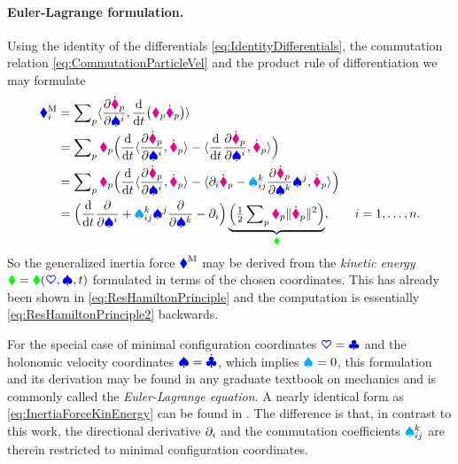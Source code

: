 \paragraph{Euler-Lagrange formulation.}
Using the identity of the differentials \eqref{eq:IdentityDifferentials}, the commutation relation \eqref{eq:CommutationParticleVel} and the product rule of differentiation we may formulate
\begin{align}
 \genForceInertiaCoeff{\LidxI}
 &= \sumParticles \sProd{\pdiff[\particlePosd{\PidxI}]{\sysVelCoeff{\LidxI}}}{\diff{t}\big(\particleMass{\PidxI} \particlePosd{\PidxI}\big)}
\nonumber\\
 &= \sumParticles \particleMass{\PidxI}  \Big( \diff{t} \sProd{\pdiff[\particlePosd{\PidxI}]{\sysVelCoeff{\LidxI}}}{\particlePosd{\PidxI}} - \sProd{\diff{t} \pdiff[\particlePosd{\PidxI}]{\sysVelCoeff{\LidxI}}}{\particlePosd{\PidxI}}\Big)
\nonumber\\
 &= \sumParticles \particleMass{\PidxI}  \Big( \diff{t} \sProd{\pdiff[\particlePosd{\PidxI}]{\sysVelCoeff{\LidxI}}}{\particlePosd{\PidxI}} - \sProd{\dirDiff{\LidxI} \particlePosd{\PidxI} - \BoltzSym{\LidxIII}{\LidxI}{\LidxII} \pdiff[\particlePosd{\PidxI}]{\sysVelCoeff{\LidxIII}} \sysVelCoeff{\LidxII}}{\particlePosd{\PidxI}}\Big)
\nonumber\\
 &= \Big(\diff{t} \pdiff{\sysVelCoeff{\LidxI}} + \BoltzSym{\LidxIII}{\LidxI}{\LidxII} \sysVelCoeff{\LidxII} \pdiff{\sysVelCoeff{\LidxIII}} - \dirDiff{\LidxI} \Big)
 \underbrace{\Big( \tfrac{1}{2} \sumParticles \particleMass{\PidxI} \norm{\particlePosd{\PidxI}}^2 \Big)}_{\kineticEnergy},
 \qquad
 \LidxI = 1,\ldots,\dimConfigSpace.
\label{eq:InertiaForceKinEnergy}
\end{align}
So the generalized inertia force $\boldsymbol{\textcolor{blue}{\blacklozenge}}^{\mathrm{M}}$ may be derived from the \textit{kinetic energy} $\textcolor{green}{\blacklozenge} = \textcolor{green}{\blacklozenge}(\boldsymbol{\textcolor{blue}{\heartsuit}}, \boldsymbol{\textcolor{blue}{\spadesuit}}, t)$ formulated in terms of the chosen coordinates.
This has already been shown in \eqref{eq:ResHamiltonPrinciple} and the computation is essentially \eqref{eq:ResHamiltonPrinciple2} backwards.

For the special case of minimal configuration coordinates $\boldsymbol{\textcolor{blue}{\heartsuit}}=\boldsymbol{\textcolor{blue}{\clubsuit}}$ and the holonomic velocity coordinates $\boldsymbol{\textcolor{blue}{\spadesuit}}=\dot{\boldsymbol{\textcolor{blue}{\clubsuit}}}$, which implies $\textcolor{cyan}{\spadesuit}^{}_{} = 0$, this formulation and its derivation may be found in any graduate textbook on mechanics and is commonly called the \textit{Euler-Lagrange equation}.
A nearly identical form as \eqref{eq:InertiaForceKinEnergy} can be found in \cite[p.\ 17]{Hamel:LagrangeEuler}.
The difference is that, in contrast to this work, the directional derivative $\partial_{i}$ and the commutation coefficients $\textcolor{cyan}{\spadesuit}^{k}_{ij}$ are therein restricted to minimal configuration coordinates. 

